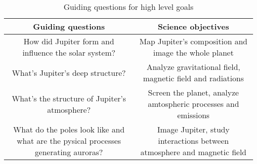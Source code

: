\renewcommand{\arraystretch}{1.5}
\begin{table}[H]
    \centering
    \begin{tabular}{|c|c|}
        \hline
        \textbf{Guiding questions} & \textbf{Science objectives} \\ 
        \hline
        How did Jupiter form and influence the solar system? & Map Jupiter's composition and image the whole planet \\ 
        \hline
        What's Jupiter's deep structure? & Analyze gravitational field, magnetic field and radiations  \\ 
        \hline
        What's the structure of Jupiter's atmosphere? & Screen the planet, analyze amtospheric processes and emissions  \\ 
        \hline
        What do the poles look like and what are the pysical processes generating auroras? & Image Jupiter, study interactions between atmosphere and magnetic field \\ 
        \hline
     
    \end{tabular}
    \centering
    \caption{Guiding questions for high level goals}
    \label{tab:Guiding questions for high level goals}
\end{table}

\renewcommand{\arraystretch}{1}

